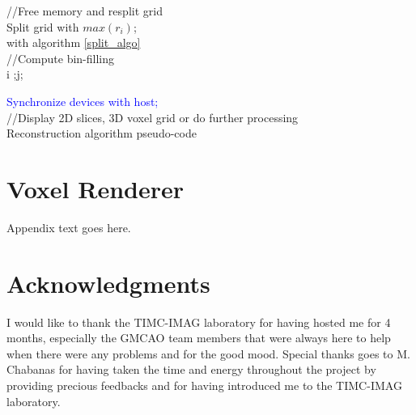 \documentclass[12pt,journal,compsoc]{IEEEtran}
\begin{document}
\begin{minipage}{\textwidth}
\begin{algorithm}
\textcolor{OliveGreen}{//Free memory and resplit grid}\\
Split grid with $max(r_i)$;\\

with algorithm \ref{split_algo}\\
\textcolor{OliveGreen}{//Compute bin-filling}\\
i ;j;\\

\textcolor{Blue}{Synchronize devices with host;}\\

\textcolor{OliveGreen}{//Display 2D slices, 3D voxel grid or do further processing}\\

\caption{Reconstruction algorithm pseudo-code}
\label{reconstruction_algorithm}
\end{algorithm}

\section{Voxel Renderer}
Appendix text goes here.

\section*{Acknowledgments}
I would like to thank the TIMC-IMAG laboratory for having hosted me for 4 months, especially the GMCAO team members that were always here to help when there were any problems and for the good mood. Special thanks goes to M. Chabanas for having taken the time and energy throughout the project by providing precious feedbacks and for having introduced me to the TIMC-IMAG laboratory.


\end{minipage}
\end{document}
